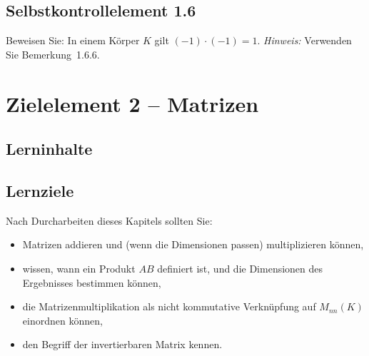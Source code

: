 \documentclass[a4paper,12pt]{article}
\begin{document}
\subsection*{Selbstkontrollelement 1.6}

Beweisen Sie: In einem Körper $K$ gilt $(-1) \cdot (-1) = 1$.
\emph{Hinweis:} Verwenden Sie Bemerkung~1.6.6.

\newpage

\section*{Zielelement 2 -- Matrizen}

\subsection*{Lerninhalte}

\begin{center}
\end{center}

\subsection*{Lernziele}

Nach Durcharbeiten dieses Kapitels sollten Sie:
\begin{itemize}
  \item Matrizen addieren und (wenn die Dimensionen passen) multiplizieren können,
  \item wissen, wann ein Produkt $AB$ definiert ist, und die Dimensionen des
        Ergebnisses bestimmen können,
  \item die Matrizenmultiplikation als nicht kommutative Verknüpfung auf $M_{nn}(K)$
        einordnen können,
  \item den Begriff der invertierbaren Matrix kennen.
\end{itemize}
\end{document}
